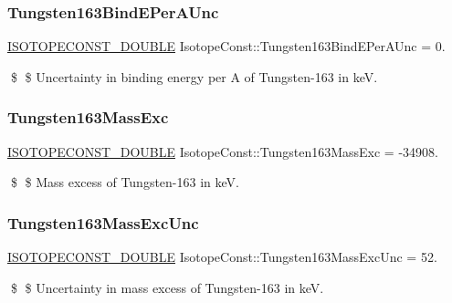 \subsubsection{\texorpdfstring{Tungsten163\+Bind\+E\+Per\+A\+Unc}{Tungsten163BindEPerAUnc}}
{\footnotesize\ttfamily \mbox{\hyperlink{group___isotope_const-_macros_ga8f45a7272ce02c0b4c65c44636ed719a}{I\+S\+O\+T\+O\+P\+E\+C\+O\+N\+S\+T\+\_\+\+D\+O\+U\+B\+LE}} Isotope\+Const\+::\+Tungsten163\+Bind\+E\+Per\+A\+Unc = 0.}

\$ \$ Uncertainty in binding energy per A of Tungsten-\/163 in keV. \mbox{\label{group___isotope_const-_tungsten-_w163_ga03bd59acf828e16d953ad3f24ec80d9f}} 
\subsubsection{\texorpdfstring{Tungsten163\+Mass\+Exc}{Tungsten163MassExc}}
{\footnotesize\ttfamily \mbox{\hyperlink{group___isotope_const-_macros_ga8f45a7272ce02c0b4c65c44636ed719a}{I\+S\+O\+T\+O\+P\+E\+C\+O\+N\+S\+T\+\_\+\+D\+O\+U\+B\+LE}} Isotope\+Const\+::\+Tungsten163\+Mass\+Exc = -\/34908.}

\$ \$ Mass excess of Tungsten-\/163 in keV. \mbox{\label{group___isotope_const-_tungsten-_w163_ga0a08edf1d020be8aa59015aef3246bd1}} 
\subsubsection{\texorpdfstring{Tungsten163\+Mass\+Exc\+Unc}{Tungsten163MassExcUnc}}
{\footnotesize\ttfamily \mbox{\hyperlink{group___isotope_const-_macros_ga8f45a7272ce02c0b4c65c44636ed719a}{I\+S\+O\+T\+O\+P\+E\+C\+O\+N\+S\+T\+\_\+\+D\+O\+U\+B\+LE}} Isotope\+Const\+::\+Tungsten163\+Mass\+Exc\+Unc = 52.}

\$ \$ Uncertainty in mass excess of Tungsten-\/163 in keV. \mbox{\label{group___isotope_const-_tungsten-_w163_ga6b4cc91f03c5ce8ff81e9472d0f36400}} 
